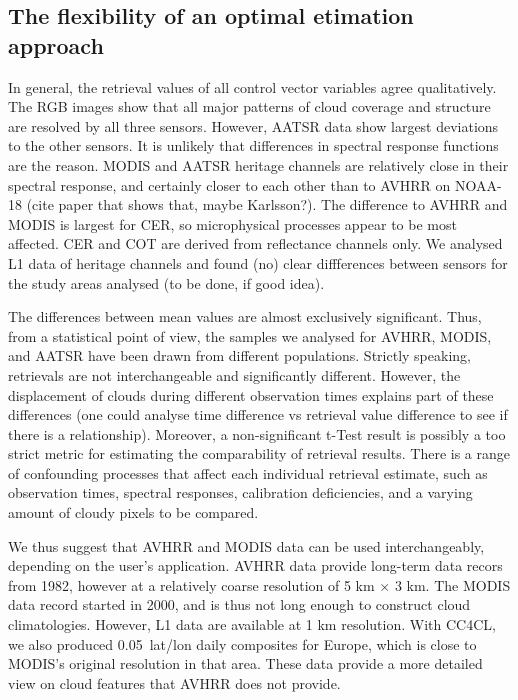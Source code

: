 \label{conclusions}

\subsection{The flexibility of an optimal etimation approach}


In general, the retrieval values of all control vector variables agree qualitatively. The RGB images show that all major patterns of cloud coverage and structure are resolved by all three sensors. However, AATSR data show largest deviations to the other sensors. It is unlikely that differences in spectral response functions are the reason. MODIS and AATSR heritage channels are relatively close in their spectral response, and certainly closer to each other than to AVHRR on NOAA-18 (cite paper that shows that, maybe Karlsson?). The difference to AVHRR and MODIS is largest for CER, so microphysical processes appear to be most affected. CER and COT are derived from reflectance channels only. We analysed L1 data of heritage channels and found (no) clear diffferences between sensors for the study areas analysed (to be done, if good idea).

The differences between mean values are almost exclusively significant. Thus, from a statistical point of view, the samples we analysed for AVHRR, MODIS, and AATSR have been drawn from different populations. Strictly speaking, retrievals are not interchangeable and significantly different. However, the displacement of clouds during different observation times explains part of these differences (one could analyse time difference vs retrieval value difference to see if there is a relationship). Moreover, a non-significant t-Test result is possibly a too strict metric for estimating the comparability of retrieval results. There is a range of confounding processes that affect each individual retrieval estimate, such as observation times, spectral responses, calibration deficiencies, and a varying amount of cloudy pixels to be compared.

We thus suggest that AVHRR and MODIS data can be used interchangeably, depending on the user's application. AVHRR data provide long-term data recors from 1982, however at a relatively coarse resolution of 5 km $\times$ 3 km. The MODIS data record started in 2000, and is thus not long enough to construct cloud climatologies. However, L1 data are available at 1 km resolution. With CC4CL, we also produced 0.05\textdegree\ lat/lon daily composites for Europe, which is close to MODIS's original resolution in that area. These data provide a more detailed view on cloud features that AVHRR does not provide.

